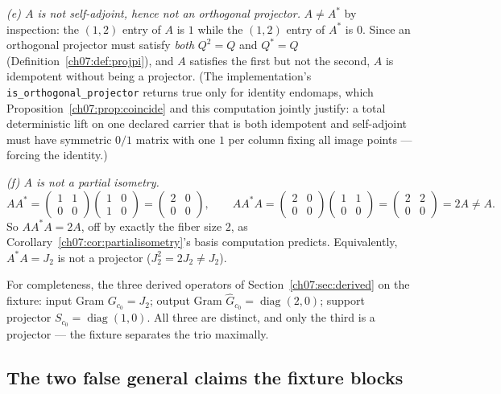 \emph{(e) $A$ is not self-adjoint, hence not an orthogonal projector.}
$A\neq A^{*}$ by inspection: the $(1,2)$ entry of $A$ is $1$ while the
$(1,2)$ entry of $A^{*}$ is $0$. Since an orthogonal projector must satisfy
\emph{both} $Q^2=Q$ and $Q^{*}=Q$ (Definition~\ref{ch07:def:projpi}), and
$A$ satisfies the first but not the second, $A$ is idempotent without being
a projector. (The implementation's \texttt{is\_orthogonal\_projector}
returns true only for identity endomaps, which
Proposition~\ref{ch07:prop:coincide} and this computation jointly justify:
a total deterministic lift on one declared carrier that is both idempotent
and self-adjoint must have symmetric $0/1$ matrix with one $1$ per column
fixing all image points --- forcing the identity.)

\emph{(f) $A$ is not a partial isometry.}
\[
AA^{*}=\begin{pmatrix}1&1\\0&0\end{pmatrix}\begin{pmatrix}1&0\\1&0\end{pmatrix}
=\begin{pmatrix}2&0\\0&0\end{pmatrix},
\qquad
AA^{*}A=\begin{pmatrix}2&0\\0&0\end{pmatrix}
\begin{pmatrix}1&1\\0&0\end{pmatrix}
=\begin{pmatrix}2&2\\0&0\end{pmatrix}=2A\neq A .
\]
So $AA^*A=2A$, off by exactly the fiber size $2$, as
Corollary~\ref{ch07:cor:partialisometry}'s basis computation predicts.
Equivalently, $A^*A=J_2$ is not a projector ($J_2^2=2J_2\neq J_2$).

For completeness, the three derived operators of
Section~\ref{ch07:sec:derived} on the fixture: input Gram $G_{c_0}=J_2$;
output Gram $\widehat{G}_{c_0}=\operatorname{diag}(2,0)$; support projector
$S_{c_0}=\operatorname{diag}(1,0)$. All three are distinct, and only the
third is a projector --- the fixture separates the trio maximally.

\subsection{The two false general claims the fixture blocks}

